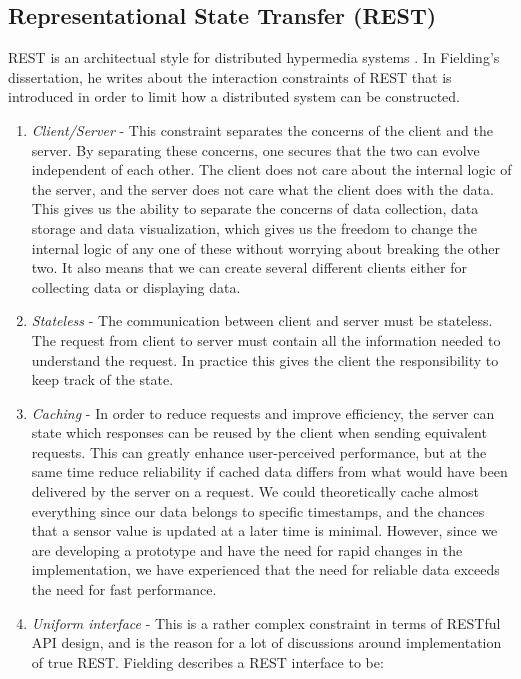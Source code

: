\subsection{Representational State Transfer (REST)}
REST is an architectual style for distributed hypermedia systems \citep{fielding2000architectural}. In Fielding's dissertation, he writes about the interaction constraints of REST that is introduced in order to limit how a distributed system can be constructed. 

\begin{enumerate}
\item{} \emph{Client/Server} - This constraint separates the concerns of the client and the server. By separating these concerns, one secures that the two can evolve independent of each other. The client does not care about the internal logic of the server, and the server does not care what the client does with the data. This gives us the ability to separate the concerns of data collection, data storage and data visualization, which gives us the freedom to change the internal logic of any one of these without worrying about breaking the other two. It also means that we can create several different clients either for collecting data or displaying data.

\item{} \emph{Stateless} - The communication between client and server must be stateless. The request from client to server must contain all the information needed to understand the request. In practice this gives the client the responsibility to keep track of the state.

\item{} \emph{Caching} - In order to reduce requests and improve efficiency, the server can state which responses can be reused by the client when sending equivalent requests. This can greatly enhance user-perceived performance, but at the same time reduce reliability if cached data differs from what would have been delivered by the server on a request. We could theoretically cache almost everything since our data belongs to specific timestamps, and the chances that a sensor value is updated at a later time is minimal. However, since we are developing a prototype and have the need for rapid changes in the implementation, we have experienced that the need for reliable data exceeds the need for fast performance.

\item{} \emph{Uniform interface} - This is a rather complex constraint in terms of RESTful API design, and is the reason for a lot of discussions around implementation of true REST. Fielding describes a REST interface to be:


\end{enumerate}
